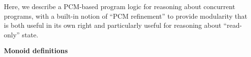 \documentclass{article}
\newcommand{\unit}{\epsilon}
\newcommand{\bool}{\textsf{bool}}
\DeclareMathOperator{\rel}{rel}
\renewcommand{\eqdef}{\triangleq}
\begin{document}
Here, we describe a PCM-based program logic for reasoning about concurrent programs,
with a built-in notion of ``PCM refinement'' to provide modularity that is both useful in its own right
and particularly useful for reasoning about ``read-only'' state.

\textbf{Monoid definitions}



\end{document}
